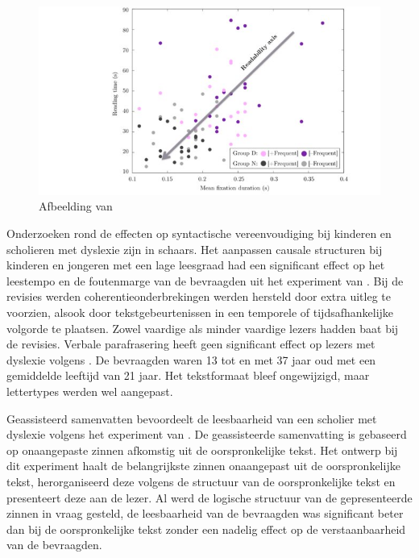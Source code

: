 \begin{figure}
\includegraphics[width=\linewidth]{img/readability-mean-fixation-duration.png}
\caption{Afbeelding van \textcite{Rello2013a}}
\label{img:readability-mean-fixation-duration}
\end{figure}

Onderzoeken rond de effecten op syntactische vereenvoudiging bij kinderen en scholieren met dyslexie zijn in schaars. Het aanpassen causale structuren bij kinderen en jongeren met een lage leesgraad had een significant effect op het leestempo en de foutenmarge van de bevraagden uit het experiment van \textcite{Linderholm2000}. Bij de revisies werden coherentieonderbrekingen werden hersteld door extra uitleg te voorzien, alsook door tekstgebeurtenissen in een temporele of tijdsafhankelijke volgorde te plaatsen. Zowel vaardige als minder vaardige lezers hadden baat bij de revisies. Verbale parafrasering heeft geen significant effect op lezers met dyslexie volgens \textcite{Rello2013c}. De bevraagden waren 13 tot en met 37 jaar oud met een gemiddelde leeftijd van 21 jaar. Het tekstformaat bleef ongewijzigd, maar lettertypes werden wel aangepast. 

\medspace

Geassisteerd samenvatten bevoordeelt de leesbaarheid van een scholier met dyslexie volgens het experiment van \textcite{Nandhini2013}. De geassisteerde samenvatting is gebaseerd op onaangepaste zinnen afkomstig uit de oorspronkelijke tekst. Het ontwerp bij dit experiment haalt de belangrijkste zinnen onaangepast uit de oorspronkelijke tekst, herorganiseerd deze volgens de structuur van de oorspronkelijke tekst en presenteert deze aan de lezer. Al werd de logische structuur van de gepresenteerde zinnen in vraag gesteld, de leesbaarheid van de bevraagden was significant beter dan bij de oorspronkelijke tekst zonder een nadelig effect op de verstaanbaarheid van de bevraagden.

